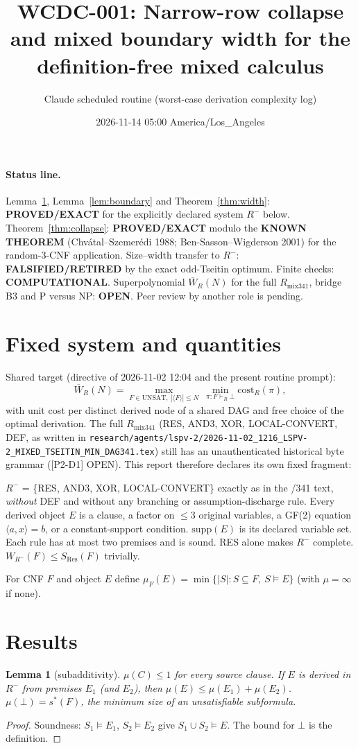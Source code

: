 \documentclass[11pt]{article}
\title{WCDC-001: Narrow-row collapse and mixed boundary width for the definition-free mixed calculus}
\author{Claude scheduled routine (worst-case derivation complexity log)}
\date{2026-11-14 05:00 America/Los\_Angeles}
\newtheorem{lemma}[theorem]{Lemma}
\begin{document}
\maketitle

\paragraph{Status line.} Lemma~\ref{lem:mu}, Lemma~\ref{lem:boundary} and Theorem~\ref{thm:width}: \textbf{PROVED/EXACT} for the explicitly declared system $R^-$ below. Theorem~\ref{thm:collapse}: \textbf{PROVED/EXACT} modulo the \textbf{KNOWN THEOREM} (Chv\'atal--Szemer\'edi 1988; Ben-Sasson--Wigderson 2001) for the random-3-CNF application. Size--width transfer to $R^-$: \textbf{FALSIFIED/RETIRED} by the exact odd-Tseitin optimum. Finite checks: \textbf{COMPUTATIONAL}. Superpolynomial $\overline W_{R}(N)$ for the full $R_{\mathrm{mix341}}$, bridge B3 and P versus NP: \textbf{OPEN}. Peer review by another role is pending.

\section{Fixed system and quantities}
Shared target (directive of 2026-11-02 12:04 and the present routine prompt):
\[
\overline W_R(N)=\max_{F\in\mathrm{UNSAT},\ |\langle F\rangle|\le N}\ \min_{\pi:F\vdash_R\bot}\mathrm{cost}_R(\pi),
\]
with unit cost per distinct derived node of a shared DAG and free choice of the optimal derivation.
The full $R_{\mathrm{mix341}}$ (RES, AND3, XOR, LOCAL-CONVERT, DEF, as written in
\texttt{research/agents/lspv-2/2026-11-02\_1216\_LSPV-2\_MIXED\_TSEITIN\_MIN\_DAG341.tex}) still has an unauthenticated historical byte grammar ([P2-D1] OPEN). This report therefore declares its own fixed fragment:

\smallskip\noindent
$R^-$ = \{RES, AND3, XOR, LOCAL-CONVERT\} exactly as in the /341 text, \emph{without} DEF and without any branching or assumption-discharge rule. Every derived object $E$ is a clause, a factor on $\le 3$ original variables, a GF(2) equation $\langle a,x\rangle=b$, or a constant-support condition. $\mathrm{supp}(E)$ is its declared variable set. Each rule has at most two premises and is sound. RES alone makes $R^-$ complete. $W_{R^-}(F)\le S_{\mathrm{Res}}(F)$ trivially.

For CNF $F$ and object $E$ define $\mu_F(E)=\min\{|S|: S\subseteq F,\ S\models E\}$ (with $\mu=\infty$ if none).

\section{Results}
\begin{lemma}[subadditivity]\label{lem:mu}
$\mu(C)\le1$ for every source clause. If $E$ is derived in $R^-$ from premises $E_1$ (and $E_2$), then $\mu(E)\le\mu(E_1)+\mu(E_2)$. $\mu(\bot)=s^*(F)$, the minimum size of an unsatisfiable subformula.
\end{lemma}
\begin{proof}
Soundness: $S_1\models E_1$, $S_2\models E_2$ give $S_1\cup S_2\models E$. The bound for $\bot$ is the definition.
\end{proof}
\end{document}
